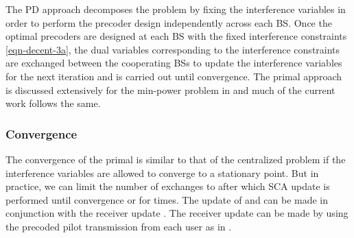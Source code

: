 
The \acl{PD} approach decomposes the problem by fixing the interference variables  in order to perform the precoder design independently across each \ac{BS}. Once the optimal precoders are designed at each \ac{BS} with the fixed interference constraints \eqref{eqn-decent-3a}, the dual variables corresponding to the interference constraints are exchanged between the cooperating \acp{BS}  to update the interference variables  for the next iteration and is carried out until convergence. The primal approach is discussed extensively for the min-power problem in \cite{pennanen2011decentralized} and much of the current work follows the same. 

\subsubsection*{Convergence}
The convergence of the primal is similar to that of the centralized problem if the interference variables  are allowed to converge to a stationary point. But in practice, we can limit the number of exchanges to  after which \ac{SCA} update is performed until convergence or for  times. The update of  and  can be made in conjunction with the receiver update . The receiver update can be made by using the precoded pilot transmission from each user as in \cite{komulainen2013effective}. 